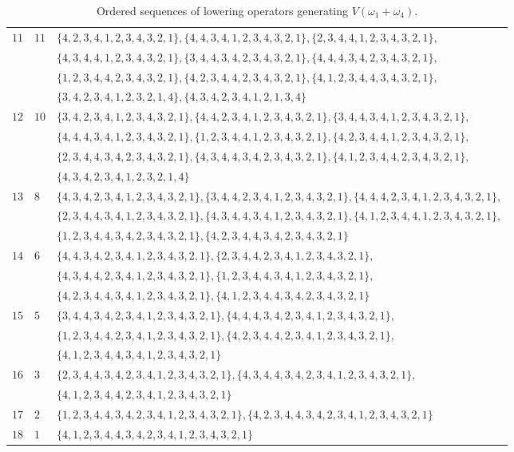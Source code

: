 \documentclass[pdftex]{sigma}
\numberwithin{equation}{section}
\begin{document}
\begin{table}[th!]
{\begin{tabular}{ |l|l|l| }
					$11$ & $11$ & $\{4,2,3,4,1,2,3,4,3,2,1\},\{4,4,3,4,1,2,3,4,3,2,1\},\{2,3,4,4,1,2,3,4,3,2,1\},$ \\ & & $\{4,3,4,4,1,2,3,4,3,2,1\},\{3,4,4,3,4,2,3,4,3,2,1\},\{4,4,4,3,4,2,3,4,3,2,1\},$ \\ & & $\{1,2,3,4,4,2,3,4,3,2,1\},\{4,2,3,4,4,2,3,4,3,2,1\},\{4,1,2,3,4,4,3,4,3,2,1\},$ \\ & & $\{3,4,2,3,4,1,2,3,2,1,4\},\{4,3,4,2,3,4,1,2,1,3,4\}$ \\
					$12$ & $10$ & $\{3,4,2,3,4,1,2,3,4,3,2,1\},\{4,4,2,3,4,1,2,3,4,3,2,1\},\{3,4,4,3,4,1,2,3,4,3,2,1\},$ \\ & & $\{4,4,4,3,4,1,2,3,4,3,2,1\},\{1,2,3,4,4,1,2,3,4,3,2,1\},\{4,2,3,4,4,1,2,3,4,3,2,1\},$ \\ & & $\{2,3,4,4,3,4,2,3,4,3,2,1\},\{4,3,4,4,3,4,2,3,4,3,2,1\},\{4,1,2,3,4,4,2,3,4,3,2,1\},$\\ & & $\{4,3,4,2,3,4,1,2,3,2,1,4\}$ \\
					$13$ & $8$ & $\{4,3,4,2,3,4,1,2,3,4,3,2,1\},\{3,4,4,2,3,4,1,2,3,4,3,2,1\},\{4,4,4,2,3,4,1,2,3,4,3,2,1\},$ \\ & & $\{2,3,4,4,3,4,1,2,3,4,3,2,1\},\{4,3,4,4,3,4,1,2,3,4,3,2,1\},\{4,1,2,3,4,4,1,2,3,4,3,2,1\},$ \\ & & $\{1,2,3,4,4,3,4,2,3,4,3,2,1\},\{4,2,3,4,4,3,4,2,3,4,3,2,1\}$ \\
					$14$ & $6$ & $\{4,4,3,4,2,3,4,1,2,3,4,3,2,1\},\{2,3,4,4,2,3,4,1,2,3,4,3,2,1\},$ \\ & & $\{4,3,4,4,2,3,4,1,2,3,4,3,2,1\},\{1,2,3,4,4,3,4,1,2,3,4,3,2,1\},$ \\ & & $\{4,2,3,4,4,3,4,1,2,3,4,3,2,1\},\{4,1,2,3,4,4,3,4,2,3,4,3,2,1\}$ \\
					$15$ & $5$ & $\{3,4,4,3,4,2,3,4,1,2,3,4,3,2,1\},\{4,4,4,3,4,2,3,4,1,2,3,4,3,2,1\},$ \\ & & $\{1,2,3,4,4,2,3,4,1,2,3,4,3,2,1\},\{4,2,3,4,4,2,3,4,1,2,3,4,3,2,1\},$ \\ & & $\{4,1,2,3,4,4,3,4,1,2,3,4,3,2,1\}$ \\
					$16$ & $3$ & $\{2,3,4,4,3,4,2,3,4,1,2,3,4,3,2,1\},\{4,3,4,4,3,4,2,3,4,1,2,3,4,3,2,1\},$\\ & & $\{4,1,2,3,4,4,2,3,4,1,2,3,4,3,2,1\}$ \\
					$17$ & $2$ & $\{1,2,3,4,4,3,4,2,3,4,1,2,3,4,3,2,1\},\{4,2,3,4,4,3,4,2,3,4,1,2,3,4,3,2,1\}$ \\
					$18$ & $1$ & $\{4,1,2,3,4,4,3,4,2,3,4,1,2,3,4,3,2,1\}$ \\		
					\hline
			\end{tabular} }
			\caption{Ordered sequences of lowering operators generating $V(\omega_1+\omega_4)$.}
			\label{table:structure_of_rep_table}
		\end{table}
		
\end{document}
